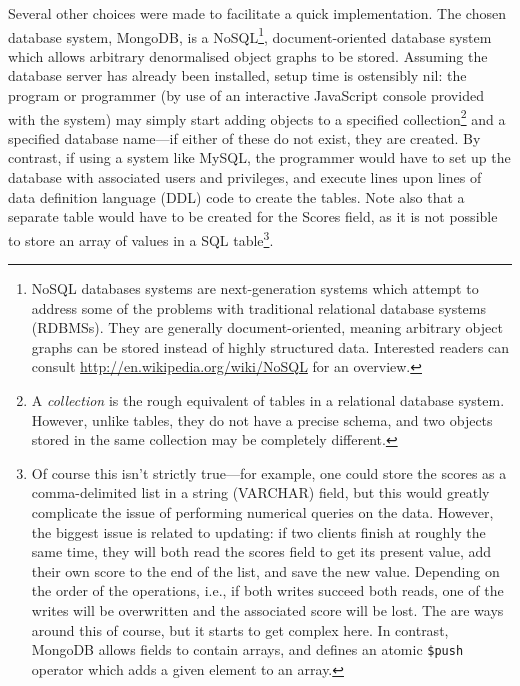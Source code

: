 Several other choices were made to facilitate a quick implementation.  The chosen database system, MongoDB, is a NoSQL\footnote{NoSQL databases systems are next-generation systems which attempt to address some of the problems with traditional relational database systems (RDBMSs).  They are generally document-oriented, meaning arbitrary object graphs can be stored instead of highly structured data.  Interested readers can consult \url{http://en.wikipedia.org/wiki/NoSQL} for an overview.}, document-oriented database system which allows arbitrary denormalised object graphs to be stored.  Assuming the database server has already been installed, setup time is ostensibly nil: the program or programmer (by use of an interactive JavaScript console provided with the system) may simply start adding objects to a specified collection\footnote{A \emph{collection} is the rough equivalent of tables in a relational database system.  However, unlike tables, they do not have a precise schema, and two objects stored in the same collection may be completely different.} and a specified database name---if either of these do not exist, they are created.  By contrast, if using a system like MySQL, the programmer would have to set up the database with associated users and privileges, and execute lines upon lines of data definition language (DDL) code to create the tables.  Note also that a separate table would have to be created for the Scores field, as it is not possible to store an array of values in a SQL table\footnote{Of course this isn't strictly true---for example, one could store the scores as a comma-delimited list in a string (VARCHAR) field, but this would greatly complicate the issue of performing numerical queries on the data.  However, the biggest issue is related to updating: if two clients finish at roughly the same time, they will both read the scores field to get its present value, add their own score to the end of the list, and save the new value.  Depending on the order of the operations, i.e., if both writes succeed both reads, one of the writes will be overwritten and the associated score will be lost.  The are ways around this of course, but it starts to get complex here.  In contrast, MongoDB allows fields to contain arrays, and defines an atomic {\tt\$push} operator which adds a given element to an array.}.


